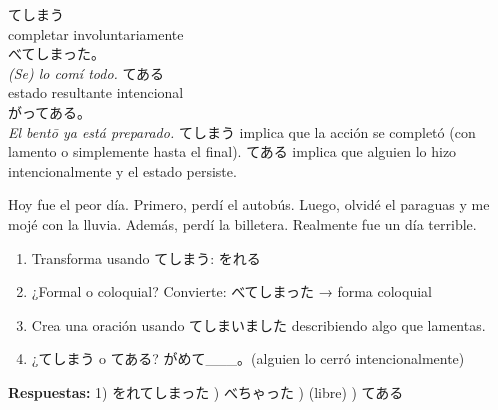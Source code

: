   {てしまう\\\small completar involuntariamente\\\small {}べてしまった。\\\textit{(Se) lo comí todo.}}
  {てある\\\small estado resultante intencional\\\small {}がってある。\\\textit{El bentō ya está preparado.}}
  {てしまう implica que la acción se completó (con lamento o simplemente hasta el final). てある implica que alguien lo hizo intencionalmente y el estado persiste.}



{Hoy fue el peor día. Primero, perdí el autobús. Luego, olvidé el paraguas y me mojé con la lluvia. Además, perdí la billetera. Realmente fue un día terrible.}

\begin{tcolorbox}[ejerciciobox, title={\emoji{pencil} Ejercicios}]
\begin{enumerate}
  \item Transforma usando てしまう: をれる
  \item ¿Formal o coloquial? Convierte: べてしまった → forma coloquial
  \item Crea una oración usando てしまいました describiendo algo que lamentas.
  \item ¿てしまう o てある? がめて\_\_\_。(alguien lo cerró intencionalmente)
\end{enumerate}
\textbf{Respuestas:}
1) をれてしまった ) べちゃった ) (libre) ) てある
\end{tcolorbox}

